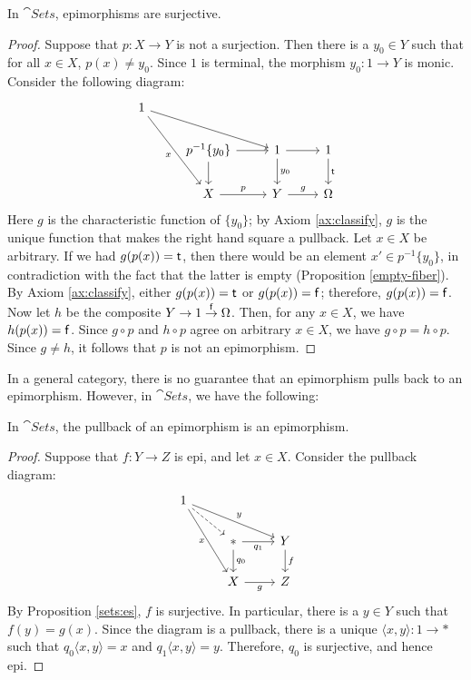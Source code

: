 \begin{prop} In $\cat{Sets}$, epimorphisms are
  surjective. \label{sets:es} \end{prop}

\begin{proof} Suppose that $p:X\to Y$ is not a surjection.  Then there
  is a $y_0\in Y$ such that for all $x\in X$, $p(x)\neq y_0$.  Since
  $1$ is terminal, the morphism $y_0:1\to Y$ is monic.  Consider the
  following diagram:
  \[ \begin{tikzcd}
    1 \arrow[ddr,"x"'] \arrow{rrd} \\
    & p^{-1}\{ y_0\} \arrow{d} \arrow{r} & 1 \arrow{d}{y_0} \arrow{r} & 1 \arrow{d}{\tr} \\
    & X \arrow{r}{p} & Y \arrow{r}{g} & \Omega \end{tikzcd} \] Here
  $g$ is the characteristic function of $\{ y_0\}$; by Axiom
  \ref{ax:classify}, $g$ is the unique function that makes the right
  hand square a pullback.  Let $x\in X$ be arbitrary. If we had
  $g(p(x))=\mathsf{t}$, then there would be an element $x'\in p^{-1}\{y_0\}$,
  in contradiction with the fact that the latter is empty (Proposition
  \ref{empty-fiber}).  By Axiom \ref{ax:classify}, either
  $g(p(x))=\mathsf{t}$ or $g(p(x))=\mathsf{f}$; therefore, $g(p(x))=\mathsf{f}$.  Now let $h$
  be the composite $Y\to 1\stackrel{\mathsf{f}}{\to} \Omega$.  Then, for any
  $x\in X$, we have $h(p(x))=\mathsf{f}$.  Since $g\circ p$ and $h\circ p$
  agree on arbitrary $x\in X$, we have $g\circ p=h\circ p$.  Since
  $g\neq h$, it follows that $p$ is not an epimorphism.
\end{proof}


In a general category, there is no guarantee that an epimorphism pulls
back to an epimorphism.  However, in $\cat{Sets}$, we have the
following:

\begin{prop} In $\cat{Sets}$, the pullback of an epimorphism is an
  epimorphism.  \label{sets-pullback-epi} \end{prop}

\begin{proof} Suppose that $f:Y\to Z$ is epi, and let $x\in X$.
  Consider the pullback diagram:
  \[ \begin{tikzcd}
    1 \arrow{ddr}[left]{x} \arrow{drr}{y} \arrow[dashed]{dr} \\
    & \ast \arrow{d}{q_0} \arrow[r,"q_1"'] &  Y \arrow{d}{f} \\
    & X \arrow[r,"g"'] & Z \end{tikzcd} \] By Proposition
  \ref{sets:es}, $f$ is surjective.  In particular, there is a $y\in
  Y$ such that $f(y)=g(x)$.  Since the diagram is a pullback, there is
  a unique $\langle x,y\rangle :1\to \ast$ such that $q_0\langle
  x,y\rangle =x$ and $q_1\langle x,y\rangle =y$.  Therefore, $q_0$ is
  surjective, and hence epi.
\end{proof}

